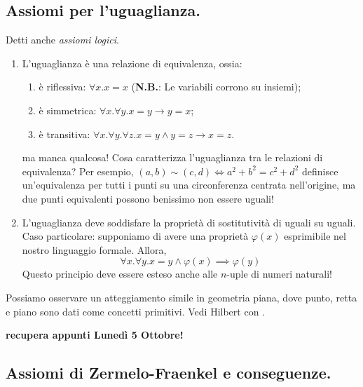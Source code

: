 \subsection{Assiomi per l'uguaglianza.}
Detti anche \emph{assiomi logici}.
\begin{enumerate}
  \item L'uguaglianza è una relazione di equivalenza, ossia:
  \begin{enumerate}
    \item è riflessiva: \(\forall x. x = x\) ({\bf N.B.}: Le variabili corrono su insiemi);
    \item è simmetrica: \(\forall x. \forall y. x = y \to y = x\);
    \item è transitiva: \(\forall x. \forall y. \forall z. x = y \land y = z \to x = z\).
  \end{enumerate}
  ma manca qualcosa! Cosa caratterizza l'uguaglianza tra le relazioni di equivalenza? Per esempio, \((a,b) \sim (c,d) \iff a^2 + b^2 = c^2 + d^2\) definisce un'equivalenza per tutti i punti su una circonferenza centrata nell'origine, ma due punti equivalenti possono benissimo non essere uguali!
  \item L'uguaglianza deve soddisfare la proprietà di sostitutività di uguali su uguali. Caso particolare: supponiamo di avere una proprietà \(\varphi(x)\) esprimibile nel nostro linguaggio formale. Allora,
  \begin{equation}
    \forall x. \forall y. x=y \land \varphi(x) \implies \varphi(y)
  \end{equation}
  Questo principio deve essere esteso anche alle \(n\)-uple di numeri naturali!
\end{enumerate}

Possiamo osservare un atteggiamento simile in geometria piana, dove punto, retta e piano sono dati come concetti primitivi. Vedi Hilbert con .

{\bf recupera appunti Lunedì 5 Ottobre!}

\subsection{Assiomi di Zermelo-Fraenkel e conseguenze.}

